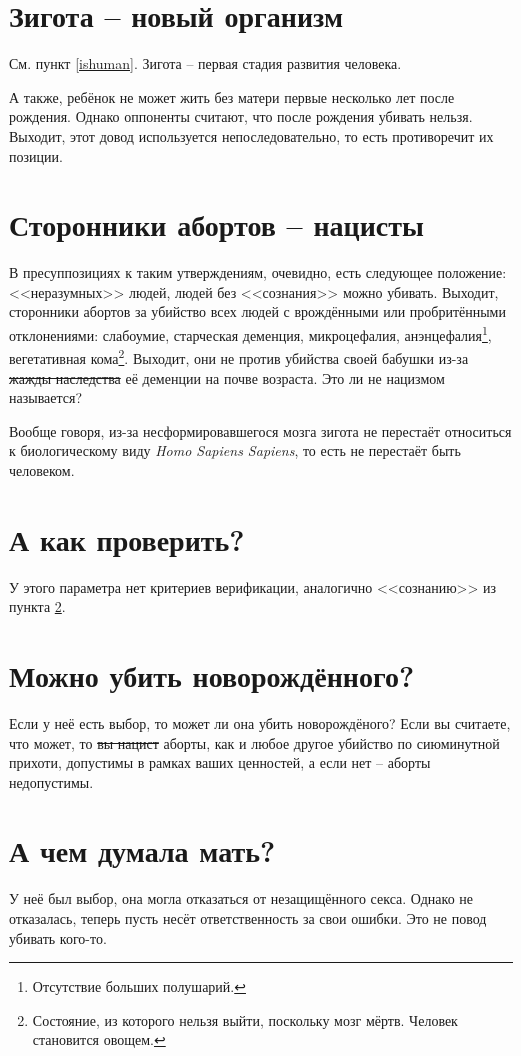 \documentclass[a4paper,12pt]{report}
\begin{document}
	\section{Зигота -- новый организм}
        См. пункт \ref{ishuman}. Зигота -- первая стадия развития человека.

        А также, ребёнок не может жить без матери первые несколько лет после рождения. Однако оппоненты считают, что после рождения убивать нельзя.
        Выходит, этот довод используется непоследовательно, то есть противоречит их позиции.
    \section{Сторонники абортов -- нацисты}\label{nazi}
        В пресуппозициях к таким утверждениям, очевидно, есть следующее положение: 
        <<неразумных>> людей, людей без <<сознания>> можно убивать. 
	    Выходит, сторонники абортов за убийство всех людей с врождёнными или 
        пробритёнными отклонениями: слабоумие, старческая деменция, микроцефалия, 
        анэнцефалия\footnote{Отсутствие больших полушарий.}, вегетативная 
        кома\footnote{Состояние, из которого нельзя выйти, поскольку мозг 
        мёртв. Человек становится овощем.}. 
        Выходит, они не против убийства своей бабушки из-за \sout{жажды наследства} 
        её деменции на почве возраста. Это ли не нацизмом называется?
        
        Вообще говоря, из-за несформировавшегося мозга зигота не перестаёт относиться к 
        биологическому виду \textit{Homo Sapiens Sapiens}, то есть не перестаёт быть человеком.
    \section{А как проверить?}
        У этого параметра нет критериев верификации, аналогично <<сознанию>> из пункта \ref{nazi}.
	\section{Можно убить новорождённого?}
        Если у неё есть выбор, то может ли она убить новорождёного? 
        Если вы считаете, что может, то \sout{вы нацист} аборты, как и любое другое 
        убийство по сиюминутной прихоти, допустимы в рамках ваших ценностей, а 
        если нет -- аборты недопустимы.
    \section{А чем думала мать?}\label{thing-about-it}
        У неё был выбор, она могла отказаться от незащищённого секса. Однако не отказалась, 
        теперь пусть несёт ответственность за свои ошибки. Это не повод убивать кого-то.
\end{document}
